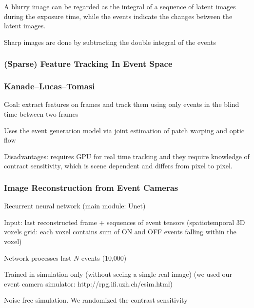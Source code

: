 A blurry image can be regarded as the integral of a sequence of latent images during the exposure time, while the events indicate the changes between the latent images.

Sharp images are done by subtracting the double integral of the events

\subsubsection{(Sparse) Feature Tracking In Event Space}

\subsubsection{Kanade–Lucas–Tomasi}

Goal: extract features on frames and track them using only events in the blind time between two frames

Uses the event generation model via joint estimation of patch warping and optic flow

Disadvantages: requires GPU for real time tracking and they require knowledge of contract sensitivity, which is scene dependent and differs from pixel to pixel.	

\subsubsection{Image Reconstruction from Event Cameras}

Recurrent neural network (main module: Unet) 

Input: last reconstructed frame + sequences of event tensors (spatiotemporal 3D voxels grid: each voxel contains sum of ON and OFF events falling within the voxel)

Network processes last $N$ events (10,000) 

Trained in simulation only (without seeing a single real image) (we used our event camera simulator: http://rpg.ifi.uzh.ch/esim.html) 

Noise free simulation. We randomized the contrast sensitivity

